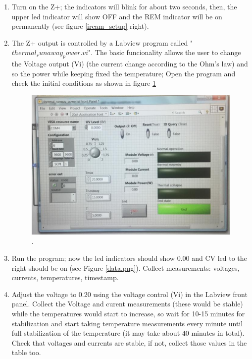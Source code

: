 \documentclass[12pt]{unlsilabsop}
\begin{document}
\begin{enumerate}
    \item Turn on the Z+; the indicators will blink for about two seconds, then, the upper led indicator will show OFF and the REM indicator will be on permanently (see figure \ref{ircam_setup} right). 
    \item The Z+ output is controlled by a Labview program called "$thermal_runaway_power.vi$". The basic funcionality allows the user to change the Voltage output (Vi) (the current change according to the Ohm's law) and so the power while keeping fixed the temperature; Open the program and check the initial conditions as shown in figure \ref{trp_lv}
      \begin{center}
        \begin{figure}[h]
          \includegraphics[width=\textwidth]{img/trp_lv1.png}
          \caption{.}
          \label{trp_lv}
        \end{figure}
      \end{center}
    \item Run the program; now the led indicators should show 0.00 and CV led to the right should be on (see Figure \ref{data.png}). Collect measurements: voltages, currents, temperatures, timestamp.
    \item Adjust the voltage to 0.20 using the voltage control (Vi) in the Labview front panel. Collect the Voltage and curent measurements (these would be stable) while the temperatures would start to increase, so wait for 10-15 minutes for stabilization and start taking temperature measurements every minute until full stabilization of the temperature (it may take about 40 minutes in total). Check that voltages and currents are stable, if not, collect those values in the table too.  

\end{enumerate}
\end{document}
